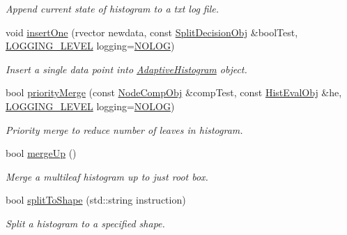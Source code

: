 \begin{DoxyCompactItemize}
\begin{DoxyCompactList}\small\item\em \-Append current state of histogram to a txt log file. \end{DoxyCompactList}\item 
void \hyperlink{classsubpavings_1_1AdaptiveHistogram_aafef86d6e4482aef11de75b83cfb4345}{insert\-One} (rvector newdata, const \hyperlink{classsubpavings_1_1SplitDecisionObj}{\-Split\-Decision\-Obj} \&bool\-Test, \hyperlink{namespacesubpavings_aef8e51096b59ecaf1a1e9b2ee24b6089}{\-L\-O\-G\-G\-I\-N\-G\-\_\-\-L\-E\-V\-E\-L} logging=\hyperlink{namespacesubpavings_aef8e51096b59ecaf1a1e9b2ee24b6089a1e5eba048e2496b2450d63fc2e9d1737}{\-N\-O\-L\-O\-G})
\begin{DoxyCompactList}\small\item\em \-Insert a single data point into \hyperlink{classsubpavings_1_1AdaptiveHistogram}{\-Adaptive\-Histogram} object. \end{DoxyCompactList}\item 
bool \hyperlink{classsubpavings_1_1AdaptiveHistogram_a4c8d2603da121585e049548baca3c712}{priority\-Merge} (const \hyperlink{classsubpavings_1_1NodeCompObj}{\-Node\-Comp\-Obj} \&comp\-Test, const \hyperlink{classsubpavings_1_1HistEvalObj}{\-Hist\-Eval\-Obj} \&he, \hyperlink{namespacesubpavings_aef8e51096b59ecaf1a1e9b2ee24b6089}{\-L\-O\-G\-G\-I\-N\-G\-\_\-\-L\-E\-V\-E\-L} logging=\hyperlink{namespacesubpavings_aef8e51096b59ecaf1a1e9b2ee24b6089a1e5eba048e2496b2450d63fc2e9d1737}{\-N\-O\-L\-O\-G})
\begin{DoxyCompactList}\small\item\em \-Priority merge to reduce number of leaves in histogram. \end{DoxyCompactList}\item 
bool \hyperlink{classsubpavings_1_1AdaptiveHistogram_a745b6edb93463e227edb9c9aa1dcb505}{merge\-Up} ()
\begin{DoxyCompactList}\small\item\em \-Merge a multileaf histogram up to just root box. \end{DoxyCompactList}\item 
bool \hyperlink{classsubpavings_1_1AdaptiveHistogram_afac8c0cb4ed44f27e7a3adf1855af676}{split\-To\-Shape} (std\-::string instruction)
\begin{DoxyCompactList}\small\item\em \-Split a histogram to a specified shape. \end{DoxyCompactList}\item 

\end{DoxyCompactItemize}
